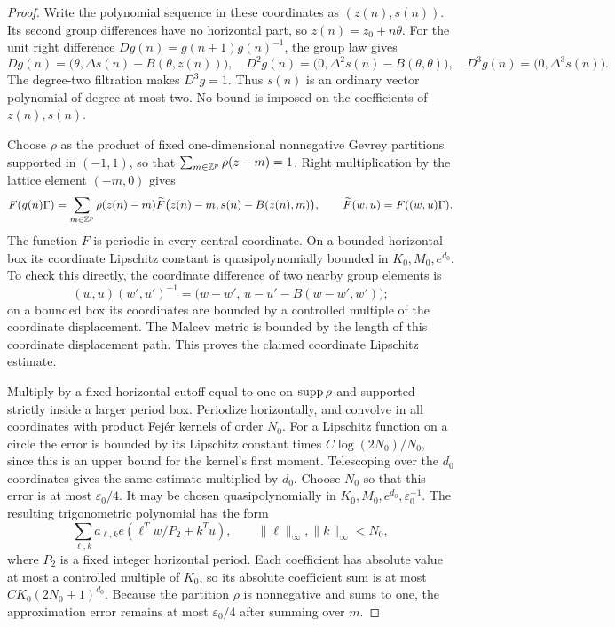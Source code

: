 \begin{proof}
Write the polynomial sequence in these coordinates as
\((z(n),s(n))\).
Its second group differences have no horizontal part, so
\(z(n)=z_0+n\theta\).
For the unit right difference \(Dg(n)=g(n+1)g(n)^{-1}\), the group law
gives
\[
 Dg(n)=\bigl(\theta,\Delta s(n)-B(\theta,z(n))\bigr),\quad
 D^2g(n)=\bigl(0,\Delta^2s(n)-B(\theta,\theta)\bigr),\quad
 D^3g(n)=\bigl(0,\Delta^3s(n)\bigr).
\]
The degree-two filtration makes \(D^3g=1\).  Thus \(s(n)\) is an
ordinary vector polynomial of degree at most two.
No bound is imposed on the coefficients of \(z(n),s(n)\).

Choose \(\rho\) as the product of fixed one-dimensional nonnegative
Gevrey partitions supported in \((-1,1)\), so that
\(\sum_{m\in\mathbb Z^p}\rho(z-m)=1\).
Right multiplication by the lattice element \((-m,0)\) gives
\[
 F(g(n)\Gamma)
 =\sum_{m\in\mathbb Z^p}\rho(z(n)-m)
       \widetilde F\bigl(z(n)-m,s(n)-B(z(n),m)\bigr),
 \qquad
 \widetilde F(w,u)=F((w,u)\Gamma).
\]
The function \(\widetilde F\) is periodic in every central coordinate.
On a bounded horizontal box its coordinate Lipschitz constant is
quasipolynomially bounded in \(K_0,M_0,e^{d_0}\).
To check this directly, the coordinate difference of two nearby group
elements is
\[
 (w,u)(w',u')^{-1}
   =\bigl(w-w',\,u-u'-B(w-w',w')\bigr);
\]
on a bounded box its coordinates are bounded by a controlled multiple
of the coordinate displacement.  The Malcev metric is bounded by
the length of this coordinate displacement path.  This proves the
claimed coordinate Lipschitz estimate.

Multiply by a fixed horizontal cutoff equal to one on \(\operatorname{supp}\rho\)
and supported strictly inside a larger period box.
Periodize horizontally, and convolve in all coordinates with product
Fej\'er kernels of order \(N_0\).
For a Lipschitz function on a circle the error is bounded by its
Lipschitz constant times \(C\log(2N_0)/N_0\), since this is an upper
bound for the kernel's first moment.  Telescoping over the \(d_0\)
coordinates gives the same estimate multiplied by \(d_0\).
Choose \(N_0\) so that this error is at most
\(\varepsilon_0/4\).  It may be chosen quasipolynomially in
\(K_0,M_0,e^{d_0},\varepsilon_0^{-1}\).
The resulting trigonometric polynomial has the form
\[
 \sum_{\ell,k}a_{\ell,k}
             e(\ell^Tw/P_2+k^Tu),
 \qquad \|\ell\|_\infty,\|k\|_\infty<N_0,
\]
where \(P_2\) is a fixed integer horizontal period.
Each coefficient has absolute value at most a controlled multiple
of \(K_0\), so its absolute coefficient sum is at most
\(C K_0(2N_0+1)^{d_0}\).
Because the partition \(\rho\) is nonnegative and sums to one,
the approximation error remains at most \(\varepsilon_0/4\)
after summing over \(m\).


\end{proof}

